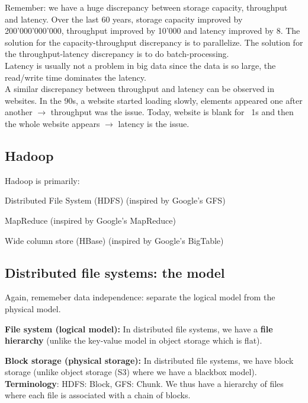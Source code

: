 \documentclass[11pt,oneside,a4paper]{article}
\begin{document}
Remember: we have a huge discrepancy between storage capacity, throughput and latency. Over the last 60 years, storage capacity improved by 200'000'000'000, throughput improved by 10'000 and latency improved by 8. The solution for the capacity-throughput discrepancy is to parallelize. The solution for the throughput-latency discrepancy is to do batch-processing.\\
Latency is usually not a problem in big data since the data is so large, the read/write time dominates the latency.\\
A similar discrepancy between throughput and latency can be observed in websites. In the 90s, a website started loading slowly, elements appeared one after another $\rightarrow$ throughput was the issue. Today, website is blank for ~1s and then the whole website appears $\rightarrow$ latency is the issue.

\subsection{Hadoop}

Hadoop is primarily:

\begin{compactitem}
	\item Distributed File System (HDFS) (inspired by Google's GFS)
	\item MapReduce (inspired by Google's MapReduce)
	\item Wide column store (HBase) (inspired by Google's BigTable)
\end{compactitem}

\subsection{Distributed file systems: the model}

Again, rememeber data independence: separate the logical model from the physical model.

\textbf{File system (logical model):} In distributed file systems, we have a \textbf{file hierarchy} (unlike the key-value model in object storage which is flat).

\textbf{Block storage (physical storage):} In distributed file systems, we have block storage (unlike object storage (S3) where we have a blackbox model).\\
\textbf{Terminology}: HDFS: Block, GFS: Chunk.
We thus have a hierarchy of files where each file is associated with a chain of blocks.\\
\end{document}
